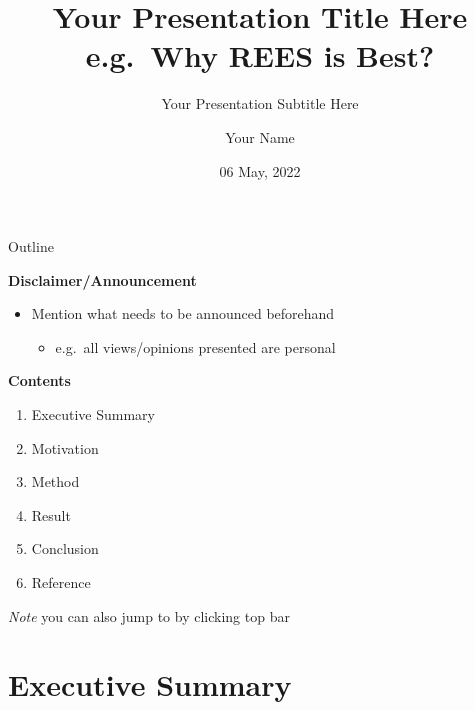 \documentclass[
  9pt,
  ignorenonframetext,
  compress]{beamer}
\title{Your Presentation Title Here e.g.~Why REES is Best?}
\subtitle{Your Presentation Subtitle Here}
\author{Your Name}
\date{06 May, 2022}
\providecommand{\tightlist}{%
  \setlength{\itemsep}{0pt}\setlength{\parskip}{0pt}}
\begin{document}
\frame{\titlepage}

\begin{frame}{Outline}
\protect\hypertarget{outline}{}
\label{agenda}

\textbf{Disclaimer/Announcement}\\

\begin{itemize}
\tightlist
\item
  Mention what needs to be announced beforehand\\

  \begin{itemize}
  \tightlist
  \item
    e.g.~all views/opinions presented are personal\\
  \end{itemize}
\end{itemize}

\textbf{Contents}

\begin{enumerate}
\item
  Executive Summary \hyperlink{1}{}\\
\item
  Motivation \hyperlink{2}{}\\
\item
  Method \hyperlink{3}{}\\
\item
  Result \hyperlink{4}{}\\
\item
  Conclusion \hyperlink{5}{}\\
\item
  Reference \hyperlink{6}{}\\
\end{enumerate}

\hfill\break

\begin{center}
\emph{Note} you can also jump to by clicking top bar 
\end{center}
\end{frame}

\hypertarget{executive-summary}{%
\section{Executive Summary}\label{executive-summary}}
\end{document}
